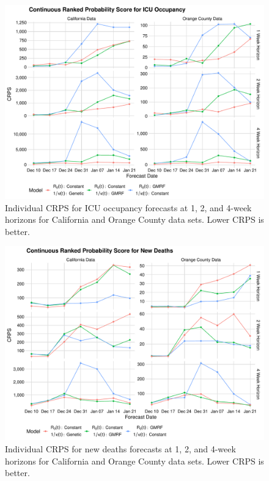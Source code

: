 \begin{figure}
    \centering
    \includegraphics[width=1.0\columnwidth]{real_data_crps_comparison_data_icu_plot}
    \caption{Individual CRPS for ICU occupancy forecasts at 1, 2, and 4-week horizons for California and Orange County data sets. Lower CRPS is better.}
    \label{ch_5:fig:real_data_crps_comparison_data_icu_plot}
\end{figure}

\begin{figure}
    \centering
    \includegraphics[width=1.0\columnwidth]{real_data_crps_comparison_data_new_deaths_plot}
    \caption{Individual CRPS for new deaths forecasts at 1, 2, and 4-week horizons for California and Orange County data sets. Lower CRPS is better.}
    \label{ch_5:fig:real_data_crps_comparison_data_new_deaths_plot}
\end{figure}

